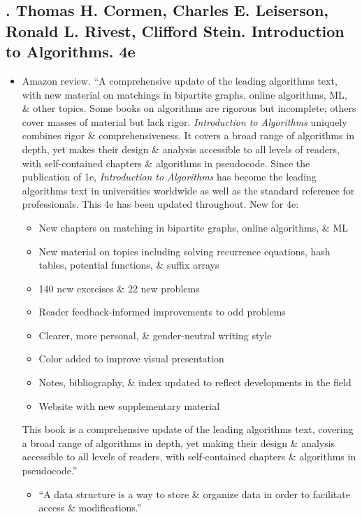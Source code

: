 \documentclass{article}
\begin{document}
\subsection{\cite{Cormen_Leiserson_Rivest_Stein_algorithm}. {\sc Thomas H. Cormen, Charles E. Leiserson,  Ronald L. Rivest, Clifford Stein}. Introduction to Algorithms. 4e}
{}
\begin{itemize}
	\item {\sf Amazon review.} ``A comprehensive update of the leading algorithms text, with new material on matchings in bipartite graphs, online algorithms, ML, \& other topics. Some books on algorithms are rigorous but incomplete; others cover masses of material but lack rigor. {\it Introduction to Algorithms} uniquely combines rigor \& comprehensiveness. It covers a broad range of algorithms in depth, yet makes their design \& analysis accessible to all levels of readers, with self-contained chapters \& algorithms in pseudocode. Since the publication of 1e, {\it Introduction to Algorithms} has become the leading algorithms text in universities worldwide as well as the standard reference for professionals. This 4e has been updated throughout. New for 4e:
	\begin{itemize}
		\item New chapters on matching in bipartite graphs, online algorithms, \& ML
		\item New material on topics including solving recurrence equations, hash tables, potential functions, \& suffix arrays
		\item 140 new exercises \& 22 new problems
		\item Reader feedback-informed improvements to odd problems
		\item Clearer, more personal, \& gender-neutral writing style
		\item Color added to improve visual presentation
		\item Notes, bibliography, \& index updated to reflect developments in the field
		\item Website with new supplementary material
	\end{itemize}
	This book is a comprehensive update of the leading algorithms text, covering a broad range of algorithms in depth, yet making their design \& analysis accessible to all levels of readers, with self-contained chapters \& algorithms in pseudocode.''
	\begin{itemize}
		\item ``A data structure is a way to store \& organize data in order to facilitate access \& modifications.''

\end{itemize}
\end{itemize}
\end{document}
